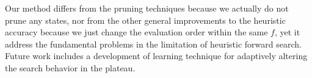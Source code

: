 Our method differs from the pruning techniques because we actually
do not prune any states, nor from the other general improvements to the
heuristic accuracy because we just change the evaluation order within the
same $f$, yet it address the fundamental problems in the limitation of
heuristic forward search.  Future work includes a development of learning
technique for adaptively altering the search behavior in the plateau.



